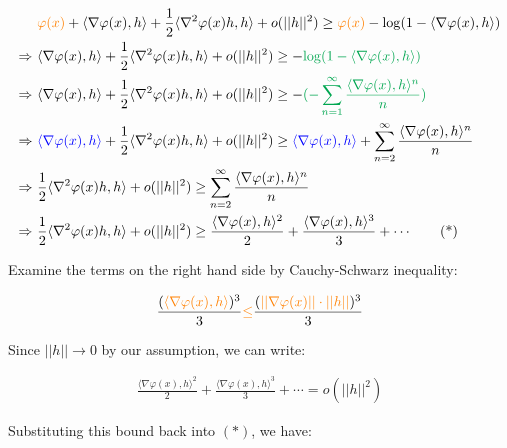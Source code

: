 \documentclass{article}
\begin{document}
\begin{align*}
    &\textcolor{orange}{\varphi(x)} + \langle \nabla \varphi(x), h \rangle + \frac{1}{2} \langle\nabla^2 \varphi(x) h, h \rangle + o(||h||^2) 
    \geq \textcolor{orange}{\varphi(x)} - \log (1 - \langle \nabla \varphi(x), h \rangle) \\
    \Rightarrow \ &\langle \nabla \varphi(x), h \rangle + \frac{1}{2} \langle\nabla^2 \varphi(x) h, h \rangle + o(||h||^2)  \geq - \textcolor{Green}{\log (1 - \langle \nabla \varphi(x), h \rangle)}  \\
    \Rightarrow \ &\langle \nabla \varphi(x), h \rangle + \frac{1}{2} \langle\nabla^2 \varphi(x) h, h \rangle + o(||h||^2)  \geq - \textcolor{Green}{(-\sum_{n=1}^{\infty} \frac{\langle \nabla \varphi(x), h \rangle^n}{n})}  \\
    \Rightarrow \ &\textcolor{blue}{\langle \nabla \varphi(x), h \rangle} + \frac{1}{2} \langle\nabla^2 \varphi(x) h, h \rangle + o(||h||^2)  \geq \textcolor{blue}{\langle \nabla \varphi(x), h \rangle} + \sum_{n=2}^{\infty} \frac{\langle \nabla \varphi(x), h \rangle^n}{n}  \\
    \Rightarrow \ &\frac{1}{2} \langle\nabla^2 \varphi(x) h, h \rangle + o(||h||^2)  \geq \sum_{n=2}^{\infty} \frac{\langle \nabla \varphi(x), h \rangle^n}{n}  \\
    \Rightarrow \ &\frac{1}{2} \langle\nabla^2 \varphi(x) h, h \rangle + o(||h||^2)  \geq \frac{\langle \nabla \varphi(x), h \rangle^2}{2} + \frac{\langle \nabla \varphi(x), h \rangle^3}{3} + \cdots \tag{*}\\
\end{align*}

Examine the terms on the right hand side by Cauchy-Schwarz inequality:

\begin{align*}
    \frac{(\textcolor{orange}{\langle \nabla \varphi(x), h \rangle})^3}{3} 
    &\textcolor{orange}{\leq} \frac{(\textcolor{orange}{||\nabla \varphi(x)|| \cdot ||h||})^3}{3} \\
\end{align*}

Since $||h|| \rightarrow 0$ by our assumption, we can write:

\begin{align*}
    \frac{\langle \nabla \varphi(x), h \rangle^2}{2} + \frac{\langle \nabla \varphi(x), h \rangle^3}{3} + \cdots = o(||h||^2)
\end{align*}

Substituting this bound back into $(*)$, we have:
\end{document}
